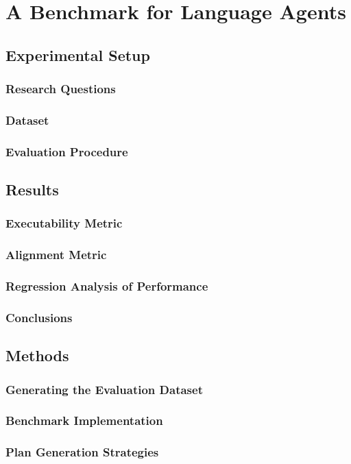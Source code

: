 

\chapter{A Benchmark for Language Agents}\label{chapter:lliterature_benchmark}

\section{Experimental Setup}

\subsection{Research Questions}

\subsection{Dataset}

\subsection{Evaluation Procedure}

\section{Results}

\subsection{Executability Metric}

\subsection{Alignment Metric}

\subsection{Regression Analysis of Performance}

\subsection{Conclusions}

\section{Methods}

\subsection{Generating the Evaluation Dataset}

\subsection{Benchmark Implementation}

\subsection{Plan Generation Strategies}

